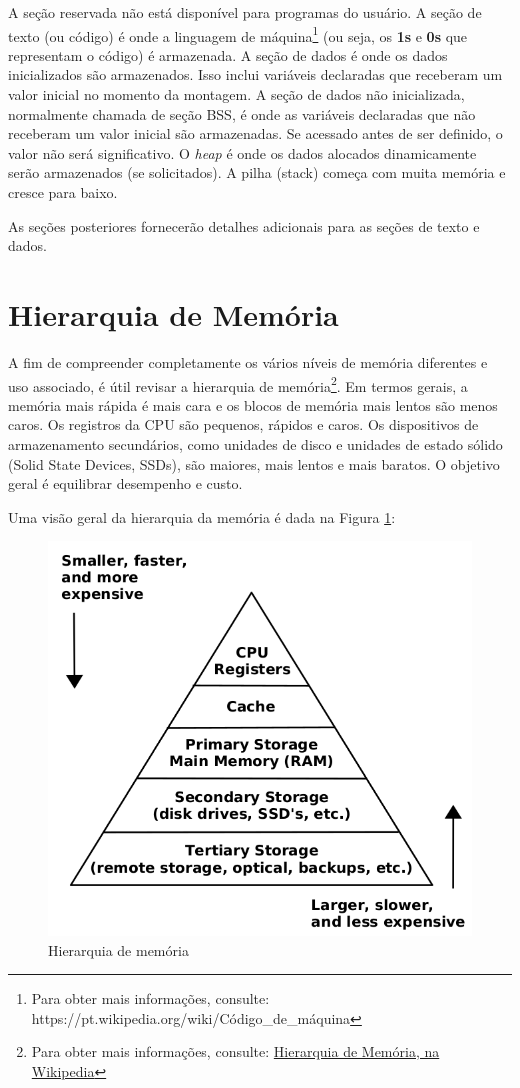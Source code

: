 A seção reservada não está disponível para programas do usuário. A seção de texto (ou código) é onde a linguagem de máquina\footnote{Para obter mais informações, consulte: https://pt.wikipedia.org/wiki/Código\_de\_máquina} (ou seja, os \textbf{1s} e \textbf{0s} que representam o código) é armazenada. A seção de dados é onde os dados inicializados são armazenados. Isso inclui variáveis declaradas que receberam um valor inicial no momento da montagem. A seção de dados não inicializada, normalmente chamada de seção BSS, é onde as variáveis declaradas que não receberam um valor inicial são armazenadas. Se acessado antes de ser definido, o valor não será significativo. O \textit{heap} é onde os dados alocados dinamicamente serão armazenados (se solicitados). A pilha (stack) começa com muita memória e cresce para baixo.

As seções posteriores fornecerão detalhes adicionais para as seções de texto e dados.


\section{Hierarquia de Memória}
A fim de compreender completamente os vários níveis de memória diferentes e uso associado, é útil revisar a hierarquia de memória\footnote{Para obter mais informações, consulte: \href{https://pt.wikipedia.org/wiki/Hierarquia\_de\_mem\%C3\%B3ria}{Hierarquia de Memória, na Wikipedia}}. Em termos gerais, a memória mais rápida é mais cara e os blocos de memória mais lentos são menos caros. Os registros da CPU são pequenos, rápidos e caros. Os dispositivos de armazenamento secundários, como unidades de disco e unidades de estado sólido (Solid State Devices, SSDs), são maiores, mais lentos e mais baratos. O objetivo geral é equilibrar desempenho e custo.

Uma visão geral da hierarquia da memória é dada na Figura \ref{fig:hierarquia}:
\begin{figure}[ht]
	\begin{center}
		\includegraphics[width=0.8\linewidth]{imagens/hierarquia}
	\end{center}
	\caption{Hierarquia de memória}
	\label{fig:hierarquia}
\end{figure}

